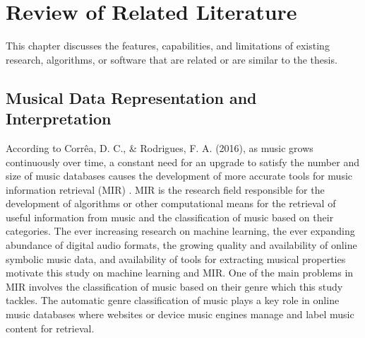 %
%
%                 

\chapter{Review of Related Literature}
\label{sec:relatedlit}
This chapter discusses the features, capabilities, and limitations of existing research, algorithms, or software that are related or are similar to the thesis.

\section{Musical Data Representation and Interpretation}

According to Corrêa, D. C., \& Rodrigues, F. A. (2016), as music grows continuously over time, a constant need for an upgrade to satisfy the number and size of music databases causes the development of more accurate tools for music information retrieval (MIR) . MIR is the research field responsible for the development of algorithms or other computational means for the retrieval of useful information from music and the classification of music based on their categories. The ever increasing research on machine learning, the ever expanding abundance of digital audio formats, the growing quality and availability of online symbolic music data, and availability of tools for extracting musical properties motivate this study on machine learning and MIR. One of the main problems in MIR involves the classification of music based on their genre which this study tackles. The automatic genre classification of music plays a key role in online music databases where websites or device music engines manage and label music content for retrieval.


